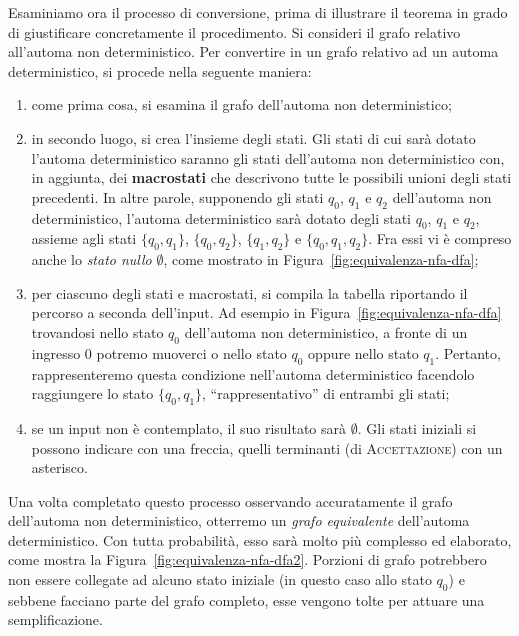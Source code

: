 \documentclass[10pt]{\classname}
\theoremstyle{newlinethm}
\theoremstyle{theorem}
\theoremstyle{definition}
\theoremstyle{definition}
\theoremstyle{definition}
\theoremstyle{definition}
\begin{document}
Esaminiamo ora il processo di conversione, prima di illustrare il teorema in grado di giustificare concretamente il procedimento. Si consideri il grafo relativo all'automa non deterministico. Per convertire in
un grafo relativo ad un automa deterministico, si procede nella seguente
maniera:
\begin{enumerate}
    \item come prima cosa, si esamina il grafo dell'automa non deterministico;
    \item in secondo luogo, si crea l'insieme degli stati. Gli stati di cui
        sarà dotato l'automa deterministico saranno gli stati dell'automa non
        deterministico con, in aggiunta, dei \textbf{macrostati} che descrivono
        tutte le possibili unioni degli stati precedenti. In altre parole,
        supponendo gli stati $q_0$, $q_1$ e $q_2$ dell'automa non
        deterministico, l'automa deterministico sarà dotato degli stati $q_0$,
        $q_1$ e $q_2$, assieme agli stati $\{q_0, q_1\}$, $\{q_0, q_2\}$,
        $\{q_1, q_2\}$ e $\{q_0, q_1, q_2\}$. Fra essi vi è compreso
        anche lo \emph{stato nullo} $\emptyset$, come mostrato in
        Figura~\ref{fig:equivalenza-nfa-dfa};
    \item per ciascuno degli stati e macrostati, si compila la tabella
        riportando il percorso a seconda dell'input. Ad esempio in
        Figura~\ref{fig:equivalenza-nfa-dfa} trovandosi nello stato $q_0$
        dell'automa non deterministico, a fronte di un ingresso 0 potremo
        muoverci o nello stato $q_0$ oppure nello stato $q_1$. Pertanto,
        rappresenteremo questa condizione nell'automa deterministico facendolo
        raggiungere lo stato $\{q_0, q_1\}$, ``rappresentativo'' di entrambi
        gli stati;
    \item se un input non è contemplato, il suo risultato sarà $\emptyset$. Gli
        stati iniziali si possono indicare con una freccia, quelli terminanti
        (di \textsc{Accettazione}) con un asterisco.
\end{enumerate}

Una volta completato questo processo osservando accuratamente il grafo
dell'automa non deterministico, otterremo un \emph{grafo equivalente}
dell'automa deterministico. Con tutta probabilità, esso sarà molto più
complesso ed elaborato, come mostra la Figura~\ref{fig:equivalenza-nfa-dfa2}.
Porzioni di grafo potrebbero non essere collegate ad alcuno stato iniziale (in
questo caso allo stato $q_0$) e sebbene facciano parte del grafo completo, esse
vengono tolte per attuare una semplificazione.
\end{document}
